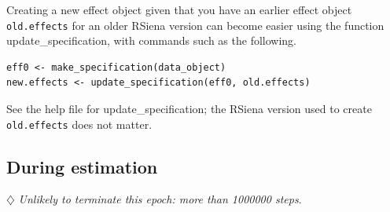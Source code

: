 \documentclass[a4paper,fleqn,11pt]{article}
\newcommand{\+}{\, + \,}
\newcommand{\sfn}[1]{\textsf{#1}}
\newcommand{\RS}{{\sf \textsf{RSiena} }}
\begin{document}
Creating a new effect object given that you have an earlier effect
object \texttt{old.effects} for an older \RS version can become
easier using the function \sfn{update\_specification},
with commands such as the following.
\begin{verbatim}
eff0 <- make_specification(data_object)
new.effects <- update_specification(eff0, old.effects)
\end{verbatim}
See the help file for  \sfn{update\_specification};
the \RS version used to create \texttt{old.effects} does not matter.



\subsection{During estimation}

$\diamondsuit$
\emph{Unlikely to terminate this epoch: more than 1000000 steps}.
\medskip
\end{document}
